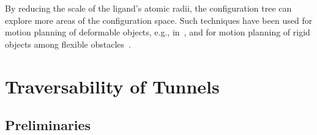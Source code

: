 \documentclass{svmult}
\begin{document}



%


By reducing the scale of the ligand's atomic radii, the configuration tree can explore more areas of the configuration space.
Such techniques have been used for motion planning of deformable objects, 
e.g., in~\cite{frank2008efficient,bayazit2001ligand,alterovitz2008motion,lamiraux2001flexible,kavraki1998towards,gayle2005path}, 
and for motion planning of rigid objects among 
flexible obstacles~\cite{rodriguez2006planning,frank2008efficient,phillips2014representation}.


\section{Traversability of Tunnels}

\subsection{Preliminaries}
\end{document}
